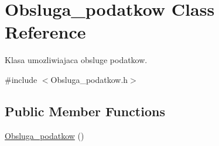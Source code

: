 \hypertarget{class_obsluga__podatkow}{}\section{Obsluga\+\_\+podatkow Class Reference}
\label{class_obsluga__podatkow}


Klasa umozliwiajaca obsluge podatkow.  




{\ttfamily \#include $<$Obsluga\+\_\+podatkow.\+h$>$}

\subsection*{Public Member Functions}
\begin{DoxyCompactItemize}
\item 
\hypertarget{class_obsluga__podatkow_a634b84304c45d982d0b164c4bf8cf00e}{}\hyperlink{class_obsluga__podatkow_a634b84304c45d982d0b164c4bf8cf00e}{Obsluga\+\_\+podatkow} ()\label{class_obsluga__podatkow_a634b84304c45d982d0b164c4bf8cf00e}


\end{DoxyCompactItemize}
